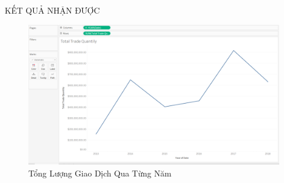 \documentclass[10pt]{beamer}
\begin{document}
 \begin{frame}{KẾT QUẢ NHẬN ĐƯỢC}
\begin{center}
    \begin{figure}[htp]
    \begin{center}
     \includegraphics[scale=.20]{TLGD.png}
    \end{center}
    \caption{Tổng Lượng Giao Dịch Qua Từng Năm}
    \label{Tổng Lượng Giao Dịch Qua Từng Năm}
    \end{figure}
\end{center}
\end{frame}
\end{document}
